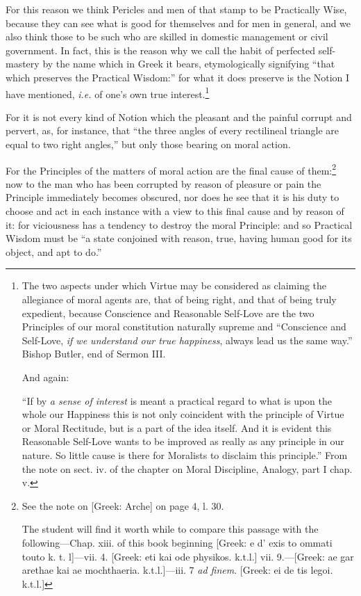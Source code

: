 For this reason we think Pericles and men of that stamp to be Practically Wise,
because they can see what is good for themselves and for men in general, and we
also think those to be such who are skilled in domestic management or civil
government. In fact, this is the reason why we call the habit of perfected
self-mastery by the name which in Greek it bears, etymologically signifying
“that which preserves the Practical Wisdom:” for what it does
preserve is the Notion I have mentioned, \emph{i.e.} of one’s own true
interest.\footnote{The two aspects under which Virtue may be considered as claiming the allegiance
of moral agents are, that of being right, and that of being truly expedient,
because Conscience and Reasonable Self-Love are the two Principles of our moral
constitution naturally supreme and “Conscience and Self-Love, \emph{if we
understand our true happiness}, always lead us the same way.” Bishop
Butler, end of Sermon III.

And again:

“If by \emph{a sense of interest} is meant a practical regard to what
is upon the whole our Happiness this is not only coincident with the principle
of Virtue or Moral Rectitude, but is a part of the idea itself. And it is
evident this Reasonable Self-Love wants to be improved as really as any
principle in our nature. So little cause is there for Moralists to disclaim
this principle.” From the note on sect. iv. of the chapter on Moral
Discipline, Analogy, part I chap. v.}

For it is not every kind of Notion which the pleasant and the painful corrupt
and pervert, as, for instance, that “the three angles of every
rectilineal triangle are equal to two right angles,” but only those
bearing on moral action.

For the Principles of the matters of moral action are the final cause of
them:\footnote{See the note on [Greek: Arche] on page 4, l. 30.

The student will find it worth while to compare this passage with the
following—Chap. xiii. of this book beginning [Greek: e d’ exis to
ommati touto k. t. l]—vii. 4. [Greek: eti kai ode physikos. k.t.l.] vii.
9.—[Greek: ae gar arethae kai ae mochthaeria. k.t.l.]—iii. 7 \emph{ad
finem}. [Greek: ei de tis legoi. k.t.l.]}
now to the man who has been corrupted by reason of pleasure or pain the
Principle immediately becomes obscured, nor does he see that it is his duty to
choose and act in each instance with a view to this final cause and by reason
of it: for viciousness has a tendency to destroy the moral Principle: and so
Practical Wisdom must be “a state conjoined with reason, true, having
human good for its object, and apt to do.”

